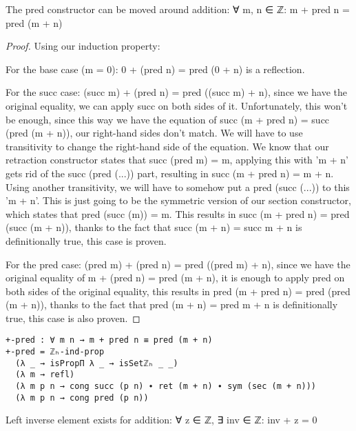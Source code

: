 \begin{theorem}
  The pred constructor can be moved around addition: ∀ m, n ∈ ℤ: m + pred n = pred (m + n)
\end{theorem}

\begin{proof}
  Using our induction property:

  For the base case (m = 0): 0 + (pred n) = pred (0 + n) is a reflection.

  For the succ case: (succ m) + (pred n) = pred ((succ m) + n), since we have the original equality, we can apply succ on both sides of it. Unfortunately, this won't be enough, since this way we have the equation of succ (m + pred n) = succ (pred (m + n)), our right-hand sides don't match. We will have to use transitivity to change the right-hand side of the equation. We know that our retraction constructor states that succ (pred m) = m, applying this with 'm + n' gets rid of the succ (pred (...)) part, resulting in succ (m + pred n) = m + n. Using another transitivity, we will have to somehow put a pred (succ (...)) to this 'm + n'. This is just going to be the symmetric version of our section constructor, which states that pred (succ (m)) = m. This results in succ (m + pred n) = pred (succ (m + n)), thanks to the fact that succ (m + n) = succ m + n is definitionally true, this case is proven.

  For the pred case: (pred m) + (pred n) = pred ((pred m) + n), since we have the original equality of m + (pred n) = pred (m + n), it is enough to apply pred on both sides of the original equality, this results in pred (m + pred n) = pred (pred (m + n)), thanks to the fact that pred (m + n) = pred m + n is definitionally true, this case is also proven.
\end{proof}

\begin{listing}[H]
\begin{verbatim}
+-pred : ∀ m n → m + pred n ≡ pred (m + n)
+-pred = ℤₕ-ind-prop
  (λ _ → isPropΠ λ _ → isSetℤₕ _ _)
  (λ m → refl)
  (λ m p n → cong succ (p n) ∙ ret (m + n) ∙ sym (sec (m + n)))
  (λ m p n → cong pred (p n))
\end{verbatim}
\caption{Agda proof of moving pred around addition}
\end{listing}

\begin{theorem}
  Left inverse element exists for addition: ∀ z ∈ ℤ, ∃ inv ∈ ℤ: inv + z = 0
\end{theorem}


